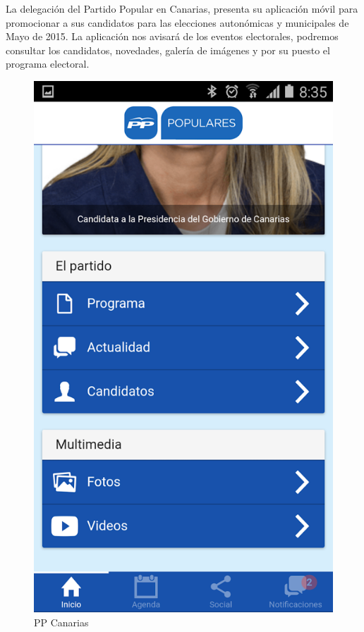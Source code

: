 La delegación del Partido Popular en Canarias, presenta su aplicación móvil para promocionar a sus candidatos para las elecciones autonómicas y municipales de Mayo de 2015. La aplicación nos avisará de los eventos electorales, podremos consultar los candidatos, novedades, galería de imágenes y por su puesto el programa electoral.

\begin{figure}[H]
\centering
\includegraphics[keepaspectratio, scale=0.35]{Media/Captures/ppcanarias.png}
\caption{PP Canarias}
\label{fig:ppcanarias}
\end{figure}

